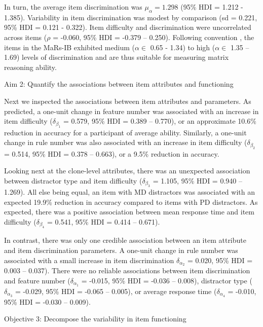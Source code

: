 \documentclass[a4paper,man,natbib]{apa6}
\makeatletter
\renewcommand{\subsubsection}{\@startsection{subsubsection}{3}
  {\z@}%
  {\b@level@two@skip}{\e@level@two@skip}%
  {\normalfont\normalsize\bfseries}}
\makeatother
\begin{document}
In turn, the average item discrimination was $\mu_\alpha = 1.298$ (95\% HDI = 1.212 - 1.385). Variability in item discrimination was modest by comparison (sd = 0.221, 95\% HDI = 0.121 - 0.322). Item difficulty and discrimination were uncorrelated across items ($\rho$ = -0.060, 95\% HDI = -0.379 -- 0.250). Following convention \citep{baker2017basics}, the items in the MaRs-IB exhibited medium ($\alpha \in$ 0.65 - 1.34) to high ($\alpha \in$ 1.35 – 1.69) levels of discrimination and are thus suitable for measuring matrix reasoning ability.

\subsubsection{Aim 2: Quantify the associations between item attributes and functioning}

Next we inspected the associations between item attributes and parameters. As predicted, a one-unit change in feature number was associated with an increase in item difficulty ($\delta_{\beta_1}$ = 0.579, 95\% HDI = 0.389 -- 0.770), or an approximate 10.6\% reduction in accuracy for a participant of average ability. Similarly, a one-unit change in rule number was also associated with an increase in item difficulty ($\delta_{\beta_2}$ = 0.514, 95\% HDI = 0.378 -- 0.663), or a 9.5\% reduction in accuracy. 

Looking next at the clone-level attributes, there was an unexpected association between distractor type and item difficulty ($\delta_{\beta_3}$ = 1.105, 95\% HDI = 0.940 -- 1.269). All else being equal, an item with MD distractors was associated with an expected 19.9\% reduction in accuracy compared to items with PD distractors. As expected, there was a positive association between mean response time and item difficulty ($\delta_{\beta_4}$ = 0.541, 95\% HDI = 0.414 -- 0.671). 

In contrast, there was only one credible association between an item attribute and item discrimination parameters. A one-unit change in rule number was associated with a small increase in item discrimination $\delta_{\alpha_2}$ = 0.020, 95\% HDI = 0.003 -- 0.037). There were no reliable associations between item discrimination and feature number ($\delta_{\alpha_1}$ = -0.015, 95\% HDI = -0.036 -- 0.008), distractor type ($\delta_{\alpha_3}$ = -0.029, 95\% HDI = -0.065 -- 0.005), or average response time ($\delta_{\alpha_4}$ = -0.010, 95\% HDI = -0.030 -- 0.009).

\subsubsection{Objective 3: Decompose the variability in item functioning}
\end{document}
